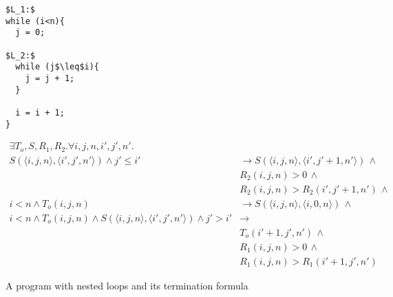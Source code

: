 \documentclass[preprint]{sigplanconf}
\theoremstyle{definition}
\begin{document}
\begin{figure*}
\begin{framed}
\begin{minipage}{0.16\textwidth}
\begin{lstlisting}[mathescape=true]
$L_1:$
while (i<n){
  j = 0;

$L_2:$
  while (j$\leq$i){
    j = j + 1;
  }

  i = i + 1;
}
\end{lstlisting}
\end{minipage}
\vline
\begin{minipage}{0.84\textwidth}
\begin{align*}
 \exists T_o, S, R_1, R_2 . \forall i, j, n, i', j', n' . \\
   S(\langle i, j, n \rangle, \langle i', j', n' \rangle) \wedge j' \leq i' & \rightarrow S(\langle i, j, n \rangle, \langle i', j'+1, n' \rangle) \, \wedge \\
   & R_2(i,j,n) > 0 \, \wedge \\
   & R_2(i,j,n) > R_2(i',j'+1,n') \, \wedge\\
   i < n \wedge T_o(i, j, n) & \rightarrow S(\langle i, j, n \rangle, \langle i, 0, n \rangle) \, \wedge \\
   i < n \wedge T_o(i, j, n) \wedge S(\langle i, j, n \rangle, \langle i', j', n' \rangle) \wedge j' > i' & \rightarrow \\
   & T_o(i'+1, j', n') \, \wedge \\
   & R_1(i, j, n) > 0 \, \wedge \\
   & R_1(i, j, n) > R_1(i'+1, j', n')
\end{align*}
\end{minipage}
\end{framed}
\caption{A program with nested loops and its termination formula\label{fig:environment-model}}
\end{figure*}



\end{document}
